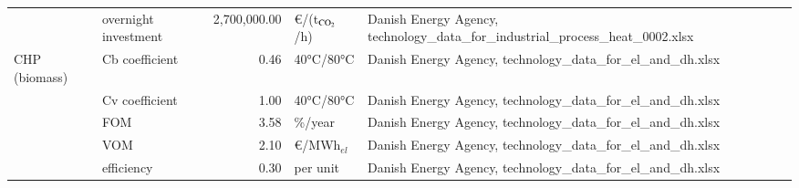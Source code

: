 \begin{longtable}{p{4cm}p{4cm}rp{3cm}p{10cm}}
                      & overnight investment & 2,700,000.00 &      \euro/(t$_{\ce{CO2}}$/h) &                                                                                                                                                                                                                                                    Danish Energy Agency, technology\_data\_for\_industrial\_process\_heat\_0002.xlsx \\
CHP (biomass) & Cb coefficient &         0.46 &                     40°C/80°C &                                                                                                                                                                                                                                                                        Danish Energy Agency, technology\_data\_for\_el\_and\_dh.xlsx \\
                      & Cv coefficient &         1.00 &                     40°C/80°C &                                                                                                                                                                                                                                                                        Danish Energy Agency, technology\_data\_for\_el\_and\_dh.xlsx \\
                      & FOM &         3.58 &                       \%/year &                                                                                                                                                                                                                                                                        Danish Energy Agency, technology\_data\_for\_el\_and\_dh.xlsx \\
                      & VOM &         2.10 &              \euro/MWh$_{el}$ &                                                                                                                                                                                                                                                                        Danish Energy Agency, technology\_data\_for\_el\_and\_dh.xlsx \\
                      & efficiency &         0.30 &                      per unit &                                                                                                                                                                                                                                                                        Danish Energy Agency, technology\_data\_for\_el\_and\_dh.xlsx \\

\end{longtable}
